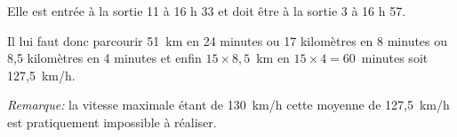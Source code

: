 Elle est entrée à la sortie 11 à 16 h 33 et doit être à la sortie 3 à 16 h 57.

Il lui faut donc parcourir 51~km en 24 minutes ou 17 kilomètres en 8 minutes ou 8,5 kilomètres en 4 minutes et enfin $15 \times 8,5$~km en $15 \times 4 = 60$~minutes soit 127,5~km/h.

\emph{Remarque:} la vitesse maximale étant de 130~km/h cette moyenne  de 127,5~km/h est pratiquement impossible à réaliser.
\vspace{0,5cm}

